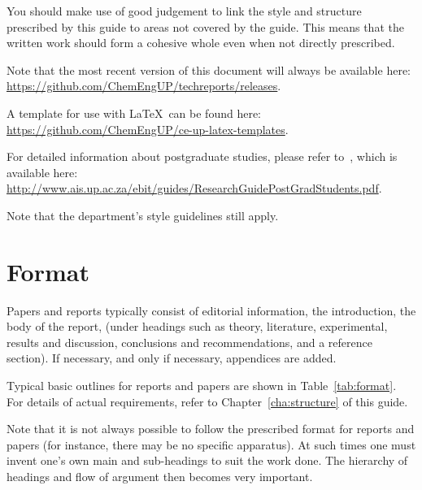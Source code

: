 \documentclass[a5paper, 10pt]{article}
\begin{document}
You should make use of good judgement to link the style and
structure prescribed by this guide to areas not covered by the guide.
This means that the written work should form a cohesive whole even
when not directly prescribed.

Note that the most recent version of this document will always be available
here:\\
\url{https://github.com/ChemEngUP/techreports/releases}.

A template for use with \LaTeX\ can be found here:\\
\url{https://github.com/ChemEngUP/ce-up-latex-templates}.

For detailed information about postgraduate studies,
please refer to~\citet{buys}, which is available here:\\
\url{http://www.ais.up.ac.za/ebit/guides/ResearchGuidePostGradStudents.pdf}.

Note that the department's style guidelines still apply.


\section{Format}
\label{cha:format}
Papers and reports typically consist of editorial information, the
introduction, the body of the report, (under headings such as theory,
literature, experimental, results and discussion, conclusions and recommendations, and a reference section).
If necessary, and only if necessary, appendices are added.

Typical basic outlines for reports and papers are shown in
Table~\ref{tab:format}.
For details of actual requirements, refer to
Chapter~\ref{cha:structure} of this guide.  

Note that it is not always possible to follow the prescribed format for reports and papers (for instance, there may be no specific apparatus).  
At such times one must invent one's own main and sub-headings to suit the work done.  
The hierarchy of headings and flow of argument then becomes very important.
\end{document}
